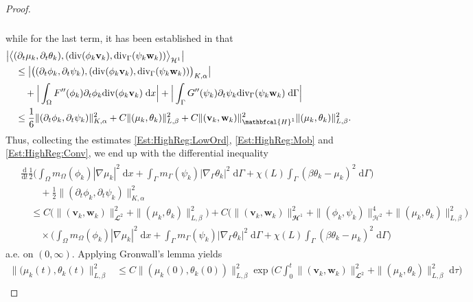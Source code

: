 \documentclass[10pt,reqno]{amsart}
\theoremstyle{remark}
\numberwithin{equation}{section}
\newcommand{\abs}[1]{| #1 |}
\newcommand{\bigabs}[1]{\big| #1 \big|}
\newcommand{\Bigabs}[1]{\Big| #1 \Big|}
\newcommand{\norm}[1]{\| #1 \|}
\newcommand{\bigang}[2]{ \big< #1 , #2  \big>}
\newcommand{\bv}{\mathbf{v}}
\newcommand{\bw}{\mathbf{w}}
\newcommand{\intO}{\int_\Omega}
\newcommand{\intG}{\int_\Gamma}
\newcommand{\dtau}{\;\mathrm d\tau}
\newcommand{\dx}{\;\mathrm{d}x}
\newcommand{\dG}{\;\mathrm d\Ga}
\newcommand{\ddt}{\frac{\mathrm d}{\mathrm dt}}
\newcommand{\delt}{\partial_{t}}
\newcommand{\Grad}{\nabla}
\newcommand{\Div}{\textnormal{div}}
\newcommand{\Gradg}{\nabla_\Ga}
\newcommand{\Divg}{\textnormal{div}_\Ga}
\newcommand{\Om}{\Omega}
\newcommand{\Ga}{\Gamma}
\begin{document}
\begin{proof}
\begin{align}
\begin{split}
    \end{split}
\end{align}
while for the last term, it has been established in \cite[Eqn.~(7.58)]{Giorgini2025} that
\begin{align}\label{Est:HighReg:Conv}
    \begin{split}
        &\bigabs{\bigang{(\delt\mu_k,\delt\theta_k)}{(\Div(\phi_k\mathbf{v}_k),\Divg(\psi_k\mathbf{w}_k))}_{\mathcal{H}^1}} \\
        &\quad \leq \bigabs{\big((\delt\phi_k,\delt\psi_k),(\Div(\phi_k\mathbf{v}_k),\Divg(\psi_k\mathbf{w}_k))\big)_{K,\alpha}} \\
        &\qquad + \Bigabs{\intO F^{\prime\prime}(\phi_k)\delt\phi_k\Div(\phi_k\mathbf{v}_k)\dx} + \Bigabs{\intG G^{\prime\prime}(\psi_k)\delt\psi_k\Divg(\psi_k\mathbf{w}_k)\dG} \\
        &\quad\leq \frac16\norm{(\delt\phi_k,\delt\psi_k)}_{K,\alpha}^2 + C\norm{(\mu_k,\theta_k)}_{L,\beta}^2 + C\norm{(\bv_k,\bw_k)}_{\mathbfcal{H}^1}^2\norm{(\mu_k,\theta_k)}_{L,\beta}^2.
    \end{split}
\end{align}
Thus, collecting the estimates \eqref{Est:HighReg:LowOrd}, \eqref{Est:HighReg:Mob} and \eqref{Est:HighReg:Conv}, we end up with the differential inequality
\begin{align}\label{Appl:ChainRule:Final}
    \begin{split}
        &\ddt\frac12\Big(\intO m_\Om(\phi_k)\abs{\Grad\mu_k}^2\dx + \intG m_\Ga(\psi_k)\abs{\Gradg\theta_k}^2\dG + \chi(L)\intG (\beta\theta_k - \mu_k)^2\dG \Big) \\
        &\qquad + \frac12\norm{(\delt\phi_k,\delt\psi_k)}_{K,\alpha}^2 \\
        &\quad \leq C\big(\norm{(\bv_k,\bw_k)}_{\mathbfcal{L}^2}^2 + \norm{(\mu_k,\theta_k)}_{L,\beta}^2\big) + C\Big(\norm{(\bv_k,\bw_k)}_{\mathbfcal{H}^1}^2 + \norm{(\phi_k,\psi_k)}_{\mathcal{H}^2}^4 + \norm{(\mu_k,\theta_k)}_{L,\beta}^2\Big) \\
        &\qquad\times\Big(\intO m_\Om(\phi_k)\abs{\Grad\mu_k}^2\dx + \intG m_\Ga(\psi_k)\abs{\Gradg\theta_k}^2\dG + \chi(L)\intG (\beta\theta_k - \mu_k)^2\dG\Big)
    \end{split}
\end{align}
a.e. on $(0,\infty)$. Applying Gronwall's lemma yields
\begin{align*}
    \norm{(\mu_k(t),\theta_k(t)}_{L,\beta}^2 &\leq C\norm{(\mu_k(0),\theta_k(0))}_{L,\beta}^2\exp\Big(C\int_0^t \norm{(\bv_k,\bw_k)}_{\mathbfcal{L}^2}^2 + \norm{(\mu_k,\theta_k)}_{L,\beta}^2\dtau\Big) \nonumber \\

\end{align*}
\end{proof}
\end{document}
